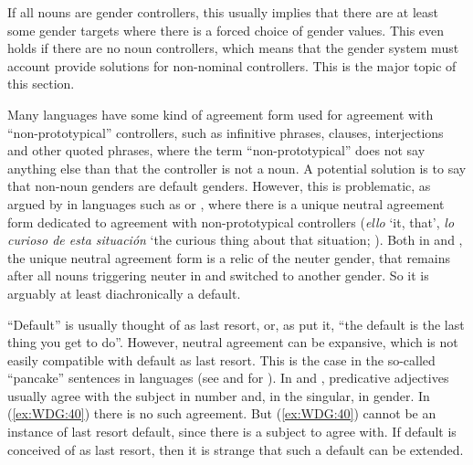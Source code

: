 \documentclass[output=collectionpaper]{langsci/langscibook}
\begin{document}
If all nouns are gender controllers, this usually implies that there are at least some gender targets where there is a forced choice of gender values. This even holds if there are no noun controllers, which means that the gender system must account provide solutions for non-nominal controllers. This is the major topic of this section.

Many languages have some kind of  agreement form used for agreement with ``non-prototypical'' controllers, such as infinitive phrases, clauses, interjections and other quoted phrases, where the term ``non-prototypical'' does not say anything else than that the controller is not a noun. A potential solution is to say that non-noun genders are default genders. However, this is problematic, as argued by \cite[214]{Corbett1991} in languages such as  or , where there is a unique neutral agreement form dedicated to agreement with non-prototypical controllers (\textit{ello} `it, that', \textit{lo curioso de esta situación} `the curious thing about that situation; \citealt[214--215]{Corbett1991}). Both in  and , the unique neutral agreement form is a relic of the neuter gender, that remains after all nouns triggering neuter in  and  switched to another gender. So it is arguably at least diachronically a default.

``Default'' is usually thought of as last resort, or, as \cite[71]{CorbettFraser1999} put it, ``the default is the last thing you get to do''. However, neutral agreement can be expansive, which is not easily compatible with default as last resort. This is the case in the so-called ``pancake'' sentences in  languages (see \citealt{Faarlund1977} and \citealt{Enger2004} for ). In  and , predicative adjectives usually agree with the subject in number and, in the singular, in gender. In (\ref{ex:WDG:40}) there is no such agreement. But (\ref{ex:WDG:40}) cannot be an instance of last resort default, since there is a subject to agree with. If default is conceived of as last resort, then it is strange that such a default can be extended.

%
\end{document}

